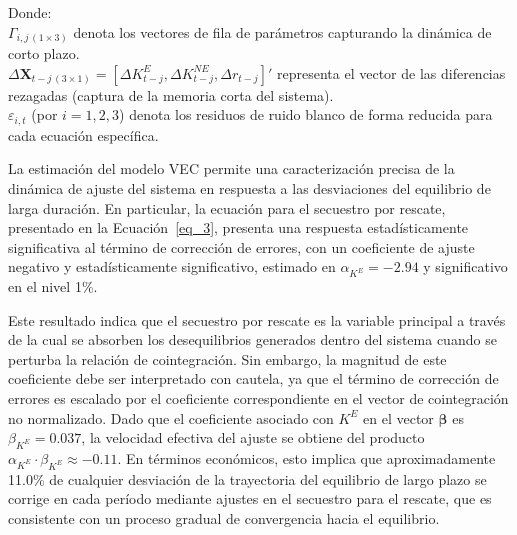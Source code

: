 \documentclass[12pt]{article}
\theoremstyle{definition}
\theoremstyle{remark}
\newcommand{\1}{\mathbf{1}}
\begin{document}
\noindent Donde: \\
$\Gamma_{i,j\,(1 \times 3)}$ denota los vectores de fila de parámetros capturando la dinámica de corto plazo. \\[0.3cm]
$\Delta \mathbf{X}_{t-j\,(3 \times 1)} = [\Delta K^E_{t-j}, \Delta K^{NE}_{t-j}, \Delta r_{t-j}]'$ representa el vector de las diferencias rezagadas (captura de la memoria corta del sistema). \\[0.3cm]
$\varepsilon_{i,t}$ (por $i=1,2,3$) denota los residuos de ruido blanco de forma reducida para cada ecuación específica.

\vspace{0.3cm}

La estimación del modelo VEC permite una caracterización precisa de la dinámica de ajuste del sistema en respuesta a las desviaciones del equilibrio de larga duración. En particular, la ecuación para el secuestro por rescate, presentado en la Ecuación~\ref{eq_3}, presenta una respuesta estadísticamente significativa al término de corrección de errores, con un coeficiente de ajuste negativo y estadísticamente significativo, estimado en $\alpha_{K^{E}} = -2.94$ y significativo en el nivel 1\%.

Este resultado indica que el secuestro por rescate es la variable principal a través de la cual se absorben los desequilibrios generados dentro del sistema cuando se perturba la relación de cointegración. Sin embargo, la magnitud de este coeficiente debe ser interpretado con cautela, ya que el término de corrección de errores es escalado por el coeficiente correspondiente en el vector de cointegración no normalizado. Dado que el coeficiente asociado con \(K^{E}\) en el vector \(\boldsymbol{\beta}\) es \(\beta_{K^{E}} = 0.037\), la velocidad efectiva del ajuste se obtiene del producto \(\alpha_{K^{E}} \cdot \beta_{K^{E}} \approx -0.11\). En términos económicos, esto implica que aproximadamente 11.0\% de cualquier desviación de la trayectoria del equilibrio de largo plazo se corrige en cada período mediante ajustes en el secuestro para el rescate, que es consistente con un proceso gradual de convergencia hacia el equilibrio.
\end{document}
